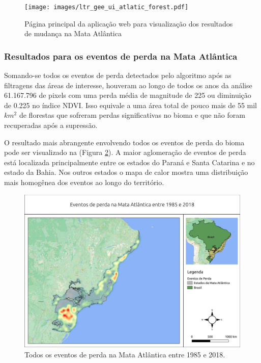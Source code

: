 \begin{figure}[H]
    \centering
    \texttt{[image: images/ltr\_gee\_ui\_atlatic\_forest.pdf]}
    \caption{Página principal da aplicação web para visualização dos resultados de mudança na Mata Atlântica}
    \label{fig:ltr_gee_ui_atlatic_forest}
\end{figure}

\subsubsection{Resultados para os eventos de perda na Mata Atlântica}

\hspace{13pt} Somando-se todos os eventos de perda detectados pelo algoritmo após as filtragens das áreas de interesse, houveram ao longo de todos os anos da análise 61.167.796 de pixels com uma perda média de magnitude de 225 ou diminuição de 0.225 no índice NDVI. Isso equivale a uma área total de pouco mais de 55 mil $ km^2 $ de florestas que sofreram perdas significativas no bioma e que não foram recuperadas após a supressão.

O resultado mais abrangente envolvendo todos os eventos de perda do bioma pode ser visualizado na (Figura \ref{fig:heat_loss_masked85_maskedgain}). A maior aglomeração de eventos de perda está localizada principalmente entre os estados do Paraná e Santa Catarina e no estado da Bahia. Nos outros estados o mapa de calor mostra uma distribuição mais homogênea dos eventos ao longo do território. 

\begin{figure}[H]
    \centering
    \includegraphics[scale=.5]{images/heatmap_loss_masked85_maskedgain.pdf}
    \caption{Todos os eventos de perda na Mata Atlântica entre 1985 e 2018.}
    \label{fig:heat_loss_masked85_maskedgain}
\end{figure}

